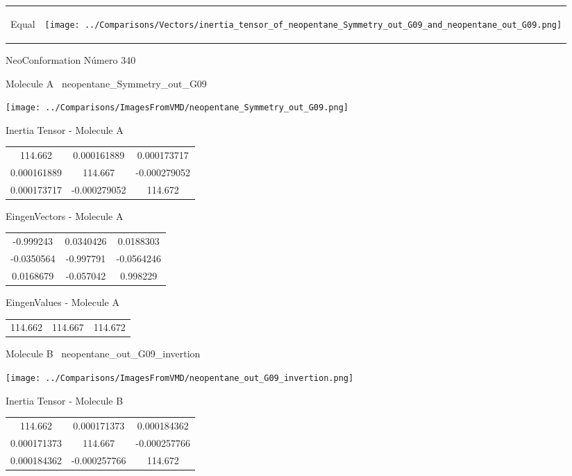 \vtab[-5mm]
\begin{tabular}{*{2}{m{}}}
\begin{center}
\textcolor{NavyBlue}{\Large Equal}
\end{center}
&
\begin{center}
\texttt{[image: ../Comparisons/Vectors/inertia\_tensor\_of\_neopentane\_Symmetry\_out\_G09\_and\_neopentane\_out\_G09.png]}
\end{center}
\end{tabular}

 \newpage

\vtab[-3cm]
\begin{center}
{\large NeoConformation \tab Número 340}
\end{center}
\begin{multicols}{2}
\begin{center}

Molecule A \
neopentane\_Symmetry\_out\_G09

\texttt{[image: ../Comparisons/ImagesFromVMD/neopentane\_Symmetry\_out\_G09.png]}

Inertia Tensor - Molecule A \\
\begin{tabular}{|c c c|}
114.662	 & 	0.000161889	 & 	0.000173717	 \\
0.000161889	 & 	114.667	 & 	-0.000279052	 \\
0.000173717	 & 	-0.000279052	 & 	114.672
\end{tabular}

\vtab
 EingenVectors - Molecule A     \\
\begin{tabular}{|c c c|}
-0.999243	 & 	0.0340426	 & 	0.0188303	 \\
-0.0350564	 & 	-0.997791	 & 	-0.0564246	 \\
0.0168679	 & 	-0.057042	 & 	0.998229
\end{tabular}

\vtab
 EingenValues - Molecule A     \\
\begin{tabular}{|c c c|}
114.662	 & 	114.667	 & 	114.672	 \\
\end{tabular}
\columnbreak

Molecule B \
neopentane\_out\_G09\_invertion

\texttt{[image: ../Comparisons/ImagesFromVMD/neopentane\_out\_G09\_invertion.png]}

Inertia Tensor - Molecule B \\
\begin{tabular}{|c c c|}
114.662	 & 	0.000171373	 & 	0.000184362	 \\
0.000171373	 & 	114.667	 & 	-0.000257766	 \\
0.000184362	 & 	-0.000257766	 & 	114.672
\end{tabular}


\end{center}
\end{multicols}
